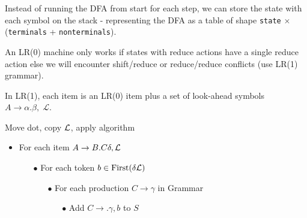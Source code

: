 Instead of running the DFA from start for each step, we can store the state with each symbol on the stack - representing the DFA as a table of shape \texttt{state} $\times$ (\texttt{terminals} + \texttt{nonterminals}). \medskip

An LR(0) machine only works if states with reduce actions have a single reduce action else we will encounter shift/reduce or reduce/reduce conflicts (use LR(1) grammar). \medskip

In LR(1), each item is an LR(0) item plus a set of look-ahead symbols $A \to \alpha . \beta, \; \mathcal L$.\medskip

\begin{algorithm} Move dot, copy $\mathcal{L}$, apply algorithm
   \begin{itemize}
       \item For each item $A \to B.C\delta, \mathcal{L}$
        \begin{itemize}
            \item[$\bullet$] For each token $b \in \operatorname{First}(\delta \mathcal{L})$
            \begin{itemize}
                \item[$\bullet$] For each production $C \to \gamma$ in Grammar
                \begin{itemize}
                    \item[$\bullet$] Add $C \to .\gamma, b$ to $S$
                \end{itemize}
            \end{itemize}
        \end{itemize}
   \end{itemize}
\end{algorithm}

